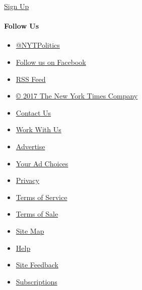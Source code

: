 \href{//www.nytimes3xbfgragh.onion/newsletters/politics/}{Sign Up}

\hypertarget{follow-us}{%
\paragraph{Follow Us}\label{follow-us}}

\begin{itemize}
\tightlist
\item
  \href{https://twitter.com/NYTPolitics}{@NYTPolitics}
\item
  \href{https://www.facebookcorewwwi.onion/nytpolitics}{Follow us on
  Facebook}
\item
  \href{//www.nytimes3xbfgragh.onion/politics/first-draft/feed/}{RSS
  Feed}
\end{itemize}

\begin{itemize}
\tightlist
\item
  \href{https://www.nytco.com}{© 2017 The New York Times Company }
\item
  \href{https://www.nytimes3xbfgragh.onion/ref/membercenter/help/infoservdirectory.html}{Contact
  Us}
\item
  \href{//www.nytco.com/careers/}{Work With Us}
\item
  \href{//nytmediakit.com/}{Advertise}
\item
  \href{https://www.nytimes3xbfgragh.onion/content/help/rights/privacy/policy/privacy-policy.html\#pp}{Your
  Ad Choices}
\item
  \href{https://www.nytimes3xbfgragh.onion/privacy}{Privacy}
\item
  \href{https://www.nytimes3xbfgragh.onion/ref/membercenter/help/agree.html}{Terms
  of Service}
\item
  \href{https://www.nytimes3xbfgragh.onion/content/help/rights/sale/terms-of-sale.html}{Terms
  of Sale}
\end{itemize}

\begin{itemize}
\tightlist
\item
  \href{//spiderbites.nytimes3xbfgragh.onion}{Site Map}
\item
  \href{https://www.nytimes3xbfgragh.onion/membercenter/sitehelp.html}{Help}
\item
  \href{https://myaccount.nytimes3xbfgragh.onion/membercenter/feedback.html}{Site
  Feedback}
\item
  \href{https://www.nytimes3xbfgragh.onion/subscriptions/Multiproduct/lp5558.html?campaignId=37WXW}{Subscriptions}
\end{itemize}
